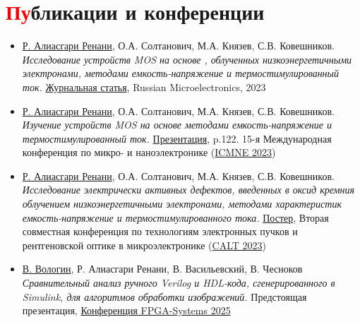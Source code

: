 \documentclass[a4paper, 10pt]{article}
\newcommand{\resumeSubHeadingListStart}{\begin{itemize}[leftmargin=0.0in, label={}]}
\newcommand{\resumeSubHeadingListEnd}{\end{itemize}}
\begin{document}
\section{\textcolor{red}{Пу}бликации и конференции}
\resumeSubHeadingListStart
    \item \underline{Р. Алиасгари Ренани}, О.А. Солтанович, М.А. Князев, С.В. Ковешников. \\ \textit{Исследование устройств MOS на основе , облученных низкоэнергетичными электронами, методами емкость-напряжение и термостимулированный ток.} \href{https://doi.org/10.1134/S1063739723600516}{Журнальная статья}, Russian Microelectronics, 2023
    \item \underline{Р. Алиасгари Ренани}, О.А. Солтанович, М.А. Князев, С.В. Ковешников. \\ \textit{Изучение устройств MOS на основе  методами емкость-напряжение и термостимулированный ток.} \href{https://icmne.ftian.ru/wp-content/uploads/icmne-2023_e-version.pdf}{Презентация}, p.122. 15-я Международная конференция по микро- и наноэлектронике (\href{https://icmne.ftian.ru}{ICMNE 2023})
    \item \underline{Р. Алиасгари Ренани}, О.А. Солтанович, М.А. Князев, С.В. Ковешников. \\ \textit{Исследование электрически активных дефектов, введенных в оксид кремния облучением низкоэнергетичными электронами, методами характеристик емкость-напряжение и термостимулированного тока.} \href{https://cebt23.iptm.ru/download/numbered/91.pdf}{Постер}, Вторая совместная конференция по технологиям электронных пучков и рентгеновской оптике в микроэлектронике (\href{https://cebt23.iptm.ru}{CALT 2023})
    \item \underline{В. Вологин}, Р. Алиасгари Ренани, В. Васильевский, В. Чесноков \\ \textit{Сравнительный анализ ручного Verilog и HDL-кода, сгенерированного в Simulink, для алгоритмов обработки изображений.} Предстоящая презентация, \href{https://meetups.yadro.com/fpga-msk-1125/}{Конференция FPGA-Systems 2025}
    
\resumeSubHeadingListEnd
\vspace{-12pt}

\end{document}
